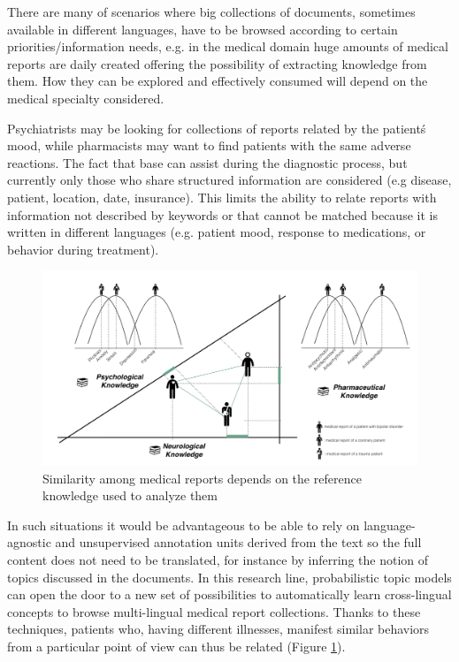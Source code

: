 There are many of scenarios where big collections of documents, sometimes available in different languages, have to be browsed according to certain priorities/information needs, e.g. in the medical domain huge amounts of medical reports are daily created offering the possibility of extracting knowledge from them. How they can be explored and effectively consumed will depend on the medical specialty considered. 

Psychiatrists may be looking for collections of reports related by the patient\'s mood, while pharmacists may want to find patients with the same adverse reactions. The fact that base can assist during the diagnostic process, but currently only those who share structured information are considered (e.g disease, patient, location, date, insurance). This limits the ability to relate reports with information not described by keywords or that cannot be matched because it is written in different languages (e.g. patient mood, response to medications, or behavior during treatment).

\begin{figure}[ht]
    \centering
    \includegraphics[width=0.7\linewidth]{context-similarity.png}
    \caption{Similarity among medical reports depends on the reference knowledge used to analyze them}
    \label{fig:context-similarity}
\end{figure}

In such situations it would be advantageous to be able to rely on language-agnostic and unsupervised annotation units derived from the text so the full content does not need to be translated, for instance by inferring the notion of topics discussed in the documents. In this research line, probabilistic topic models can open the door to a new set of possibilities to automatically learn cross-lingual concepts to browse multi-lingual medical report collections. Thanks to these techniques, patients who, having different illnesses, manifest similar behaviors from a particular point of view can thus be related (Figure \ref{fig:context-similarity}). 

